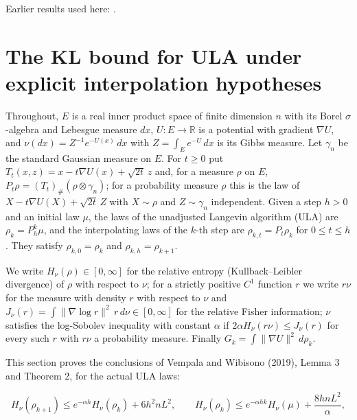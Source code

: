 \documentclass[11pt,a4paper]{report}
\begin{document}
Earlier results used here: \cite[Section~3.26.3]{LangevinLean2026ULASC}.
\section{\texorpdfstring{The KL bound for ULA under explicit interpolation hypotheses}{The KL bound for ULA under explicit interpolation hypotheses}}
\label{proof-module-UnadjustedLangevin-LSI-Theorem-lean}


Throughout, \(E\) is a real inner product space of finite dimension \(n\) with its Borel \(\sigma\)-algebra and Lebesgue measure \(dx\), \(U:E\to\mathbb R\) is a potential with gradient \(\nabla U\), and \(\nu(dx)=Z^{-1}e^{-U(x)}\,dx\) with \(Z=\int_Ee^{-U}\,dx\) is its Gibbs measure. Let \(\gamma_n\) be the standard Gaussian measure on \(E\). For \(t\ge0\) put \(T_t(x,z)=x-t\nabla U(x)+\sqrt{2t}\,z\) and, for a measure \(\rho\) on \(E\), \(P_t\rho=(T_t)_\#(\rho\otimes\gamma_n)\); for a probability measure \(\rho\) this is the law of \(X-t\nabla U(X)+\sqrt{2t}\,Z\) with \(X\sim\rho\) and \(Z\sim\gamma_n\) independent. Given a step \(h>0\) and an initial law \(\mu\), the laws of the unadjusted Langevin algorithm (ULA) are \(\rho_k=P_h^k\mu\), and the interpolating laws of the \(k\)-th step are \(\rho_{k,t}=P_t\rho_k\) for \(0\le t\le h\). They satisfy \(\rho_{k,0}=\rho_k\) and \(\rho_{k,h}=\rho_{k+1}\).




We write \(H_\nu(\rho)\in[0,\infty]\) for the relative entropy (Kullback–Leibler divergence) of \(\rho\) with respect to \(\nu\); for a strictly positive \(C^1\) function \(r\) we write \(r\nu\) for the measure with density \(r\) with respect to \(\nu\) and \(J_\nu(r)=\int\|\nabla\log r\|^2\,r\,d\nu\in[0,\infty]\) for the relative Fisher information; \(\nu\) satisfies the log-Sobolev inequality with constant \(\alpha\) if \(2\alpha H_\nu(r\nu)\le J_\nu(r)\) for every such \(r\) with \(r\nu\) a probability measure. Finally \(G_k=\int\|\nabla U\|^2\,d\rho_k\).




This section proves the conclusions of Vempala and Wibisono (2019), Lemma 3 and Theorem 2, for the actual ULA laws:


\[H_\nu(\rho_{k+1})\le e^{-\alpha h}H_\nu(\rho_k)+6h^2nL^2,\qquad H_\nu(\rho_k)\le e^{-\alpha hk}H_\nu(\mu)+\frac{8hnL^2}{\alpha},\]
\end{document}
